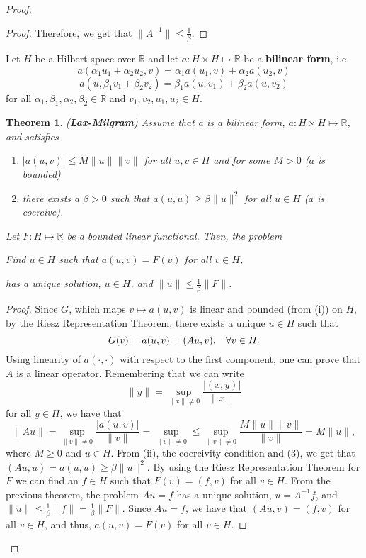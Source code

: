 \documentclass[oneside]{book}
\newtheorem{theorem}{Theorem}
\newcommand{\R}{{\mathbb R}}
\newcommand{\Ai}{A^{-1}}
\begin{document}
\begin{proof}
\begin{proof}
Therefore, we get that $\| \Ai \| \leq \frac{1}{\beta}.$
\end{proof}
Let $H$ be a Hilbert space over $\R$ and let $a : H \times H \mapsto \R$ be a \textbf{bilinear form}, i.e.
\[ a(\alpha_1 u_1+ \alpha_2 u_2 , v) = \alpha_1 a(u_1, v) + \alpha_2 a(u_2, v)\]
\[ a(u, \beta_1 v_1 + \beta_2 v_2) = \beta_1 a(u, v_1) + \beta_2 a(u, v_2)\]
for all $\alpha_1, \beta_1, \alpha_2, \beta_2 \in \R$ and $v_1, v_2, u_1,u_2 \in H$. 
\begin{theorem}(\textbf{Lax-Milgram}) Assume that a is a bilinear form, $a: H \times H \mapsto \R$, and satisfies
\begin{enumerate}
\item[(i)] $|a(u, v)| \leq M \| u \| \| v \|$ for all $u, v \in H$ and for some $M > 0$ ($a$ is bounded) 
\item[(ii)] there exists a $\beta  > 0$ such that $a(u, u) \geq \beta \| u \|^2$ for all $u \in H$ ($a$ is coercive). 
\end{enumerate}
Let $F: H \mapsto \R$ be a bounded linear functional. Then, the problem 
\begin{center}
\textit{Find $u \in H$ such that $a(u, v) = F(v)$ for all $v \in H$,}
\end{center}
has a unique solution, $u \in H$, and $\| u \| \leq \frac{1}{\beta} \| F \|$. 
\end{theorem}
\begin{proof}
Since $G$, which maps $v \mapsto a(u, v)$ is linear and bounded (from (i)) on $H$, by the Riesz Representation Theorem, there exists a unique $u \in H$ such that 
\begin{equation}
G(v) = a(u, v) = (Au, v), \hspace{3mm} \forall v \in H.
\end{equation}
Using linearity of $a(\cdot, \cdot)$ with respect to the first component, one can prove that $A$ is a linear operator. Remembering that we can write 
\[ \| y \| = \sup\limits_{\| x \| \neq 0} \frac{|(x, y)|}{\| x \|}\]
for all $y \in H$, we have that 
\[ \| Au \| = \sup\limits_{\| v \| \neq 0} \frac{|a(u, v)|}{\| v \|} = \sup\limits_{\| v \| \neq 0} \leq \sup\limits_{\| v \| \neq 0} \frac{M \| u \| \| v \|}{\| v \|} = M \| u \|,\]
where $M \geq 0$ and $u \in H$. From (ii), the coercivity condition and (3), we get that $(Au, u) = a(u, u) \geq \beta \| u \|^2$. By using the Riesz Representation Theorem for $F$ we can find an $f \in H$ such that $F(v) = (f, v)$ for all $v \in H$. From the previous theorem, the problem $Au = f$ has a unique solution, $u = \Ai f$, and $\| u \| \leq \frac{1}{\beta} \| f\| = \frac{1}{\beta} \| F \|$. Since $Au = f$, we have that $(Au, v) = (f, v)$ for all $v \in H$, and thus, $a(u, v) = F(v)$ for all $v \in H$. 
\end{proof}

\end{proof}
\end{document}

